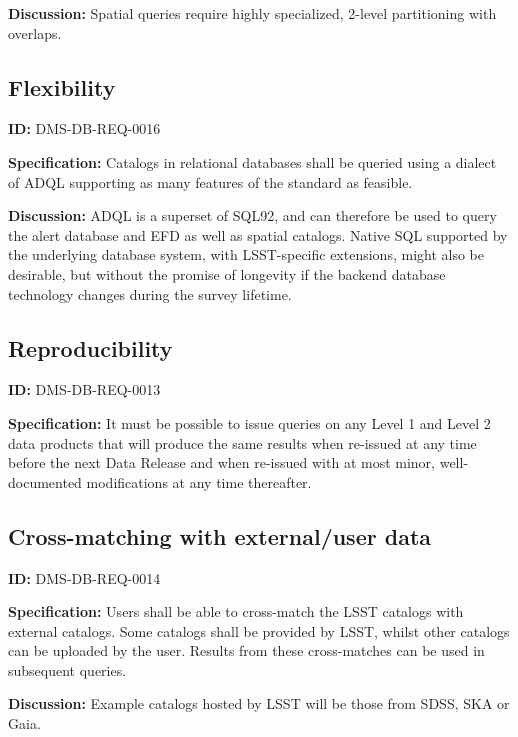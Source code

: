 \documentclass[SE,toc,lsstdraft]{lsstdoc}
\begin{document}
\textbf{Discussion:}
Spatial queries require highly specialized, 2-level partitioning with overlaps.

\subsection{Flexibility}

\label{DMS-DB-REQ-0016}
\textbf{ID:} DMS-DB-REQ-0016

\textbf{Specification:}
Catalogs in relational databases shall be queried using a dialect of ADQL supporting as many features of the standard as feasible.

\textbf{Discussion:}
ADQL is a superset of SQL92, and can therefore be used to query the alert database and EFD as well as spatial catalogs. Native SQL supported by the underlying database system, with LSST-specific extensions, might also be desirable, but without the promise of longevity if the backend database technology changes during the survey lifetime.

\subsection{Reproducibility}

\label{DMS-DB-REQ-0013}
\textbf{ID:} DMS-DB-REQ-0013

\textbf{Specification:}
It must be possible to issue queries on any Level 1 and Level 2 data products that will produce the same results when re-issued at any time before the next Data Release and when re-issued with at most minor, well-documented modifications at any time thereafter.

\subsection{Cross-matching with external/user data}

\label{DMS-DB-REQ-0014}
\textbf{ID:} DMS-DB-REQ-0014

\textbf{Specification:}
Users shall be able to cross-match the LSST catalogs with external catalogs. Some catalogs shall be provided by LSST, whilst other catalogs can be uploaded by the user. Results from these cross-matches can be used in subsequent queries.

\textbf{Discussion:}
Example catalogs hosted by LSST will be those from SDSS, SKA or Gaia.


\end{document}
